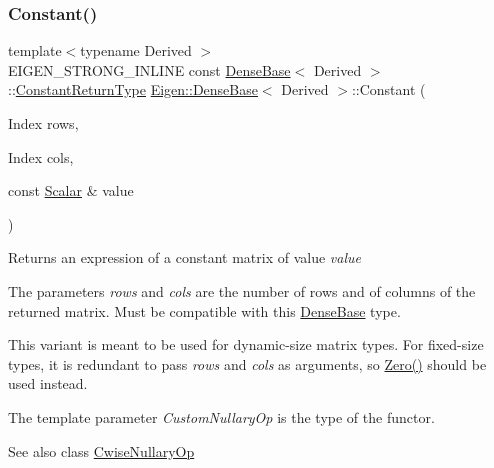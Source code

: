\subsubsection{\texorpdfstring{Constant()}{Constant()}\hspace{0.1cm}{\footnotesize\ttfamily [1/3]}}
{\footnotesize\ttfamily template$<$typename Derived $>$ \\
E\+I\+G\+E\+N\+\_\+\+S\+T\+R\+O\+N\+G\+\_\+\+I\+N\+L\+I\+NE const \mbox{\hyperlink{class_eigen_1_1_dense_base}{Dense\+Base}}$<$ Derived $>$\+::\mbox{\hyperlink{class_eigen_1_1_cwise_nullary_op}{Constant\+Return\+Type}} \mbox{\hyperlink{class_eigen_1_1_dense_base}{Eigen\+::\+Dense\+Base}}$<$ Derived $>$\+::Constant (\begin{DoxyParamCaption}\item[{Index}]{rows,  }\item[{Index}]{cols,  }\item[{const \mbox{\hyperlink{class_eigen_1_1_dense_base_a5feed465b3a8e60c47e73ecce83e39a2}{Scalar}} \&}]{value }\end{DoxyParamCaption})\hspace{0.3cm}{\ttfamily [static]}}

\begin{DoxyReturn}{Returns}
an expression of a constant matrix of value {\itshape value} 
\end{DoxyReturn}
The parameters {\itshape rows} and {\itshape cols} are the number of rows and of columns of the returned matrix. Must be compatible with this \mbox{\hyperlink{class_eigen_1_1_dense_base}{Dense\+Base}} type.

This variant is meant to be used for dynamic-\/size matrix types. For fixed-\/size types, it is redundant to pass {\itshape rows} and {\itshape cols} as arguments, so \mbox{\hyperlink{class_eigen_1_1_dense_base_a8c4be762b10041d64a2b2ce85bb14ba0}{Zero()}} should be used instead.

The template parameter {\itshape Custom\+Nullary\+Op} is the type of the functor.

\begin{DoxySeeAlso}{See also}
class \mbox{\hyperlink{class_eigen_1_1_cwise_nullary_op}{Cwise\+Nullary\+Op}} 
\end{DoxySeeAlso}
\mbox{\label{class_eigen_1_1_dense_base_ad8236107f739860be6a5debeede8fdbf}} 
